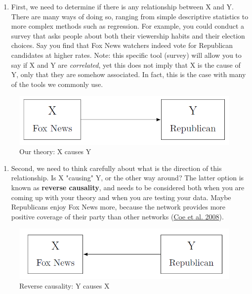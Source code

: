 \documentclass{book}
\providecommand{\tightlist}{%
  \setlength{\itemsep}{0pt}\setlength{\parskip}{0pt}}
\begin{document}
\begin{enumerate}
\def\labelenumi{\arabic{enumi}.}
\tightlist
\item
  First, we need to determine if there is any relationship between X and Y.
  There are many ways of doing so, ranging from simple descriptive statistics
  to more complex methods such as regression. For example, you could conduct a
  survey that asks people about both their viewership habits and their
  election choices. Say you find that Fox News watchers indeed vote for
  Republican candidates at higher rates. Note: this specific tool (survey)
  will allow you to say if X and Y are \emph{correlated}, yet this does not
  imply that X is the cause of Y, only that they are somehow associated. In
  fact, this is the case with many of the tools we commonly use.
\end{enumerate}

\begin{figure}
\hypertarget{fig:fig2-1}{%
\centering
\includegraphics{images/CI/fig2-1.png}
\caption{Our theory: X causes Y}\label{fig:fig2-1}
}
\end{figure}

\begin{enumerate}
\def\labelenumi{\arabic{enumi}.}
\setcounter{enumi}{1}
\tightlist
\item
  Second, we need to think carefully about what is the direction of this
  relationship. Is X "causing" Y, or the other way around? The latter option
  is known as \textbf{reverse causality}, and needs to be considered both when
  you are coming up with your theory and when you are testing your data. Maybe
  Republicans enjoy Fox News more, because the network provides more positive
  coverage of their party than other networks
  (\protect\hyperlink{ref-coeHostileNewsPartisan2008}{Coe et al. 2008}).
\end{enumerate}

\begin{figure}
\hypertarget{fig:fig2-2}{%
\centering
\includegraphics{images/CI/fig2-2.png}
\caption{Reverse causality: Y causes X}\label{fig:fig2-2}
}
\end{figure}
\end{document}
